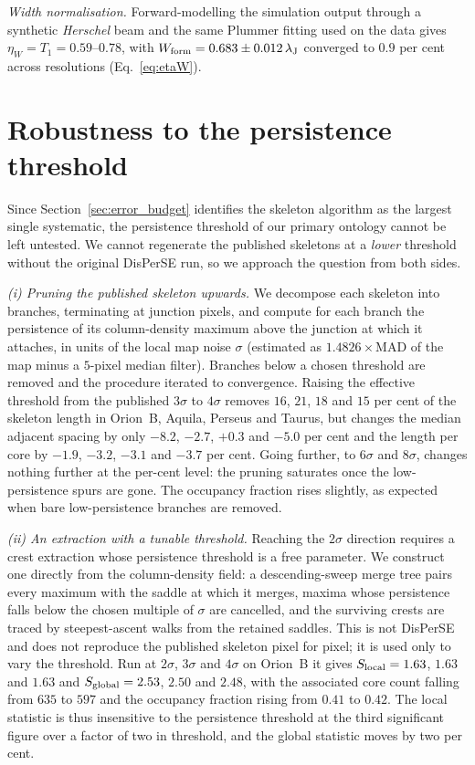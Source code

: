 \documentclass[usenatbib,twoside,twocolumn]{mnras}
\begin{document}
\emph{Width normalisation.} Forward-modelling the simulation output through a synthetic \textit{Herschel} beam and the same Plummer fitting used on the data gives $\eta_W=T_1=0.59$--$0.78$, with $W_{\rm form}=0.683\pm0.012\,\lambda_{\rm J}$ converged to $0.9$ per cent across resolutions (Eq.~\ref{eq:etaW}).

\section{Robustness to the persistence threshold}
\label{sec:persistence}

Since Section~\ref{sec:error_budget} identifies the skeleton algorithm as the largest single systematic, the persistence threshold of our primary ontology cannot be left untested. We cannot regenerate the published skeletons at a \emph{lower} threshold without the original DisPerSE run, so we approach the question from both sides.

\smallskip\noindent\emph{(i) Pruning the published skeleton upwards.} We decompose each skeleton into branches, terminating at junction pixels, and compute for each branch the persistence of its column-density maximum above the junction at which it attaches, in units of the local map noise $\sigma$ (estimated as $1.4826\times$MAD of the map minus a $5$-pixel median filter). Branches below a chosen threshold are removed and the procedure iterated to convergence. Raising the effective threshold from the published $3\sigma$ to $4\sigma$ removes $16$, $21$, $18$ and $15$ per cent of the skeleton length in Orion~B, Aquila, Perseus and Taurus, but changes the median adjacent spacing by only $-8.2$, $-2.7$, $+0.3$ and $-5.0$ per cent and the length per core by $-1.9$, $-3.2$, $-3.1$ and $-3.7$ per cent. Going further, to $6\sigma$ and $8\sigma$, changes nothing further at the per-cent level: the pruning saturates once the low-persistence spurs are gone. The occupancy fraction rises slightly, as expected when bare low-persistence branches are removed.

\smallskip\noindent\emph{(ii) An extraction with a tunable threshold.} Reaching the $2\sigma$ direction requires a crest extraction whose persistence threshold is a free parameter. We construct one directly from the column-density field: a descending-sweep merge tree pairs every maximum with the saddle at which it merges, maxima whose persistence falls below the chosen multiple of $\sigma$ are cancelled, and the surviving crests are traced by steepest-ascent walks from the retained saddles. This is not DisPerSE and does not reproduce the published skeleton pixel for pixel; it is used only to vary the threshold. Run at $2\sigma$, $3\sigma$ and $4\sigma$ on Orion~B it gives $S_{\rm local}=1.63$, $1.63$ and $1.63$ and $S_{\rm global}=2.53$, $2.50$ and $2.48$, with the associated core count falling from $635$ to $597$ and the occupancy fraction rising from $0.41$ to $0.42$. The local statistic is thus insensitive to the persistence threshold at the third significant figure over a factor of two in threshold, and the global statistic moves by two per cent.
\end{document}

